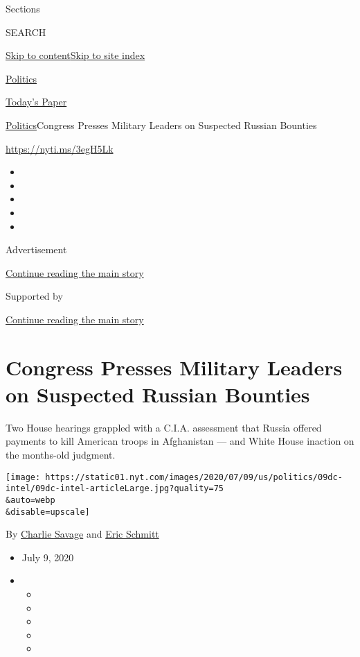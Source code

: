 Sections

SEARCH

\protect\hyperlink{site-content}{Skip to
content}\protect\hyperlink{site-index}{Skip to site index}

\href{https://www.nytimes.com/section/politics}{Politics}

\href{https://myaccount.nytimes.com/auth/login?response_type=cookie\&client_id=vi}{}

\href{https://www.nytimes.com/section/todayspaper}{Today's Paper}

\href{/section/politics}{Politics}\textbar{}Congress Presses Military
Leaders on Suspected Russian Bounties

\url{https://nyti.ms/3egH5Lk}

\begin{itemize}
\item
\item
\item
\item
\item
\end{itemize}

Advertisement

\protect\hyperlink{after-top}{Continue reading the main story}

Supported by

\protect\hyperlink{after-sponsor}{Continue reading the main story}

\hypertarget{congress-presses-military-leaders-on-suspected-russian-bounties}{%
\section{Congress Presses Military Leaders on Suspected Russian
Bounties}\label{congress-presses-military-leaders-on-suspected-russian-bounties}}

Two House hearings grappled with a C.I.A. assessment that Russia offered
payments to kill American troops in Afghanistan --- and White House
inaction on the months-old judgment.

\texttt{[image: https://static01.nyt.com/images/2020/07/09/us/politics/09dc-intel/09dc-intel-articleLarge.jpg?quality=75\\\&auto=webp\\\&disable=upscale]}

By \href{https://www.nytimes.com/by/charlie-savage}{Charlie Savage} and
\href{https://www.nytimes.com/by/eric-schmitt}{Eric Schmitt}

\begin{itemize}
\item
  July 9, 2020
\item
  \begin{itemize}
  \item
  \item
  \item
  \item
  \item
  \end{itemize}
\end{itemize}

